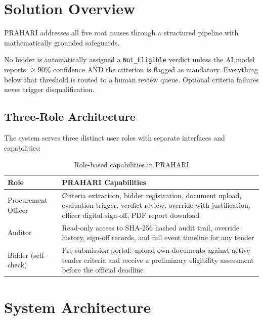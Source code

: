 \documentclass[12pt,a4paper]{article}
\begin{document}
\section{Solution Overview}

PRAHARI addresses all five root causes through a structured pipeline with
mathematically grounded safeguards.

\begin{guaranteebox}
No bidder is automatically assigned a \texttt{Not\_Eligible} verdict unless the AI
model reports $\geq 90\%$ confidence AND the criterion is flagged as mandatory.
Everything below that threshold is routed to a human review queue. Optional criteria
failures never trigger disqualification.
\end{guaranteebox}

\subsection{Three-Role Architecture}

The system serves three distinct user roles with separate interfaces and capabilities:

\begin{table}[H]
\centering
\begin{tabularx}{\linewidth}{@{}lX@{}}
\toprule
\textbf{Role} & \textbf{PRAHARI Capabilities} \\
\midrule
Procurement Officer &
    Criteria extraction, bidder registration, document upload, evaluation
    trigger, verdict review, override with justification, officer digital
    sign-off, PDF report download \\[6pt]
Auditor &
    Read-only access to SHA-256 hashed audit trail, override history,
    sign-off records, and full event timeline for any tender \\[6pt]
Bidder (self-check) &
    Pre-submission portal: upload own documents against active tender
    criteria and receive a preliminary eligibility assessment before
    the official deadline \\
\bottomrule
\end{tabularx}
\caption{Role-based capabilities in PRAHARI}
\end{table}

\section{System Architecture}
\end{document}
